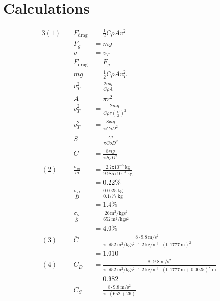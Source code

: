 \documentclass[12pt]{article}
\begin{document}
    \section{Calculations}
        \begin{alignat*}{3}
            (1) ~ && F_{\mathrm{drag}} &= \frac{1}{2}C\rho Av^2\\
            &&F_g &= mg\\
            &&v &= v_T\\
            &&F_{\mathrm{drag}} &= F_g\\
            &&mg &=  \frac{1}{2}C\rho Av_T^2\\
            &&v_T^2 &= \frac{2mg}{C\rho A}\\
            &&A &= \pi r^2\\
            &&v_T^2 &= \frac{2mg}{C\rho \pi \left( \frac{D}{2} \right) ^2}\\
            &&v_T^2 &= \frac{8mg}{\pi C\rho D^2}\\
            &&S &= \frac{8g}{\pi C\rho D^2}\\
            &&C & = \frac{8mg}{\pi S\rho D^2}\\
            (2) ~ && \frac{\sigma_m}{\overline{m}} &= \frac{2.2\mathrm{x}10^{-5}~\mathrm{kg}}{9.985
            \mathrm{x}10^{-3}~\mathrm{kg}}\\
            &&& = 0.22\%\\
            &&\frac{\sigma_D}{\overline{D}} & = \frac{0.0025~\mathrm{kg}}{0.1777~\mathrm{kg}}\\
            &&& = 1.4\%\\
            &&\frac{\sigma_S}{\overline{S}} & = \frac{26~\mathrm{m}^2/\mathrm{kg}\mathrm{s}^2}{652
            ~\mathrm{m}^2/\mathrm{kg}\mathrm{s}^2}\\
            &&&=4.0\%\\
            (3) ~ && \overline{C} &= \frac{8 \cdot 9.8~\mathrm{m}/\mathrm{s}^2}{\pi \cdot 652
            ~\mathrm{m}^2/\mathrm{kg}\mathrm{s}^2 \cdot 1.2~\mathrm{kg}/\mathrm{m}^3 \cdot 
            (0.1777~\mathrm{m})^2 }\\
            &&& = 1.010\\
            (4) && C_D &= \frac{8 \cdot 9.8~\mathrm{m}/\mathrm{s}^2}{\pi \cdot 652~\mathrm{m}^2/
            \mathrm{kg}\mathrm{s}^2 \cdot 1.2~\mathrm{kg}/\mathrm{m}^3 \cdot (0.1777~\mathrm{m} + 
            0.0025)^2~\mathrm{m} }\\ 
            &&& = 0.982\\
            && C_S & = \frac{8 \cdot 9.8~\mathrm{m}/\mathrm{s}^2}{\pi \cdot (652 + 26)
}
\end{alignat*}
\end{document}

